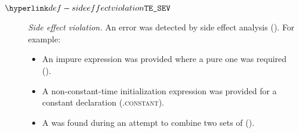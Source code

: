 \begin{description}
\hypertarget{def-sideeffectviolation}{}
\item[$\SideEffectViolation$]
  \textit{Side effect violation.}
  An error was detected by side effect analysis ().
  For example:
  \begin{itemize}
    \item An impure expression was provided where a pure one was required \\
      ().
    \item A non-constant-time initialization expression was provided for a constant declaration (.\textsc{constant}).
    \item A \sideeffectconflictterm{} was found during an attempt to combine two sets of \sideeffectdescriptorsterm{} ().
  \end{itemize}

\end{description}

